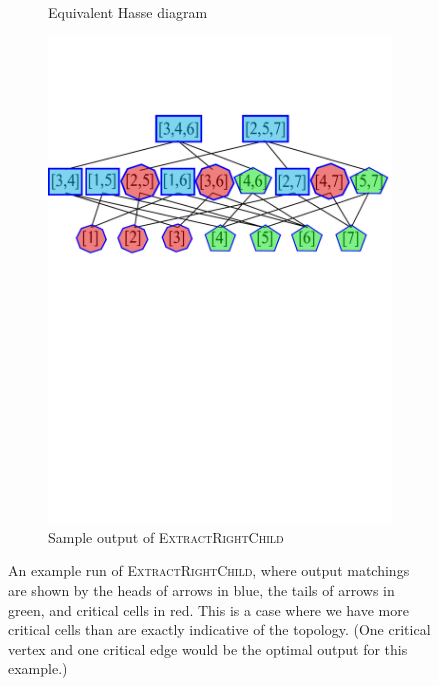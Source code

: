 \documentclass[11pt]{article}
\begin{document}
\begin{figure}
\begin{subfigure}{.33\textwidth}
  \caption{Equivalent Hasse diagram}
  \label{fig:sub2}
\end{subfigure}
\begin{subfigure}{.33\textwidth}
  \centering
  \includegraphics[width=.95\linewidth]{cat-alg5.pdf}
	\caption{Sample output of \textsc{ExtractRightChild}}
  \label{fig:sub3}
\end{subfigure}
	\caption{An example run of \textsc{ExtractRightChild}, where output matchings are shown by the heads of arrows in blue, the tails of arrows in green, and critical cells in red. This is a case where we have more critical cells than are exactly indicative of the topology. (One critical vertex and one critical edge would be the optimal output for this example.)}
\label{fig:test}
\end{figure}
\end{document}
